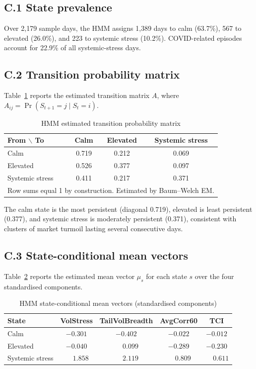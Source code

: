 \documentclass[11pt]{article}
\begin{document}
\subsection*{C.1 State prevalence}

Over 2{,}179 sample days, the HMM assigns 1{,}389 days to calm (63.7\%), 567 to elevated (26.0\%), and 223 to systemic stress (10.2\%). COVID-related episodes account for 22.9\% of all systemic-stress days.

\subsection*{C.2 Transition probability matrix}

Table~\ref{tab:app_transmat} reports the estimated transition matrix $A$, where $A_{ij} = \Pr(S_{t+1} = j \mid S_t = i)$.

\begin{table}[ht]
\centering
\small
\caption{HMM estimated transition probability matrix}
\label{tab:app_transmat}
\begin{tabular}{lccc}
\hline\hline
From $\backslash$ To & Calm & Elevated & Systemic stress \\
\hline
Calm             & 0.719 & 0.212 & 0.069 \\
Elevated         & 0.526 & 0.377 & 0.097 \\
Systemic stress  & 0.411 & 0.217 & 0.371 \\
\hline\hline
\multicolumn{4}{l}{\footnotesize Row sums equal 1 by construction. Estimated by Baum--Welch EM.}
\end{tabular}
\end{table}

The calm state is the most persistent (diagonal 0.719), elevated is least persistent (0.377), and systemic stress is moderately persistent (0.371), consistent with clusters of market turmoil lasting several consecutive days.

\subsection*{C.3 State-conditional mean vectors}

Table~\ref{tab:app_hmm_means} reports the estimated mean vector $\mu_s$ for each state $s$ over the four standardised components.

\begin{table}[ht]
\centering
\small
\caption{HMM state-conditional mean vectors (standardised components)}
\label{tab:app_hmm_means}
\begin{tabular}{lcccc}
\hline\hline
State & VolStress & TailVolBreadth & AvgCorr60 & TCI \\
\hline
Calm             & $-0.301$ & $-0.402$ & $-0.022$ & $-0.012$ \\
Elevated         & $-0.040$ & $\phantom{-}0.099$ & $-0.289$ & $-0.230$ \\
Systemic stress  & $\phantom{-}1.858$ & $\phantom{-}2.119$ & $\phantom{-}0.809$ & $\phantom{-}0.611$ \\
\hline\hline
\end{tabular}
\end{table}
\end{document}
